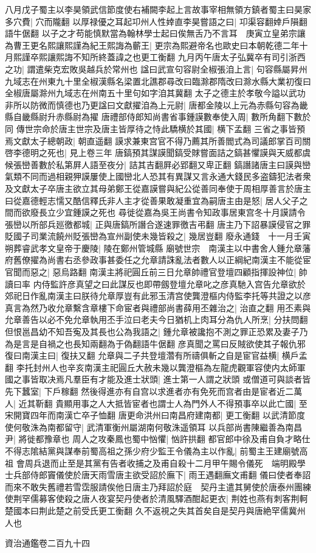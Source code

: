 八月戊子蜀主以李昊領武信節度使右補闕李起上言故事宰相無領方鎮者蜀主曰昊家多穴費|{
	穴而隴翻}
以厚禄優之耳起卭州人性婞直李昊嘗語之曰|{
	卭渠容翻婞戶隕翻語牛倨翻}
以子之才苟能慎默當為翰林學士起曰俟無舌乃不言耳　庚寅立皇弟宗讓為曹王更名熙讓熙謹為紀王熙誨為蘄王|{
	更宗為熙避帝名也歐史曰本朝乾德二年十月熙謹卒熙讓熙誨不知所終蓋諱之也更工衡翻}
九月丙午唐太子弘冀卒有司引浙西之功|{
	謂遣柴克宏敗吳越兵於常州也}
諡曰武宣句容尉全椒張洎上言|{
	句容縣屬昇州九域志在州東九十里全椒漢縣名梁置北譙郡尋改曰臨滁郡隋改曰滁水縣大業初復曰全椒唐屬滁州九域志在州南五十里句如字洎其冀翻}
太子之德主於孝敬今謚以武功非所以防微而慎德也乃更諡曰文獻擢洎為上元尉|{
	唐都金陵以上元為赤縣句容為畿縣自畿縣尉升赤縣尉為擢}
唐禮部侍郎知尚書省事鍾謨數奉使入周|{
	數所角翻下數於同}
傳世宗命於唐主世宗及唐主皆厚待之恃此驕横於其國|{
	横下孟翻}
三省之事皆預焉文獻太子總朝政|{
	朝直遥翻}
謨求兼東宫官不得乃薦其所善閻式為司議郎掌百司關啓李德明之死也|{
	見上卷三年}
唐鎬預其謀謨聞鎬受賕嘗面詰之鎬甚懼謨與天威都虞候張巒善數於私第屛人語至夜分|{
	詰其吉翻屛必郢翻又卑正翻}
鎬譖諸唐主曰謨與巒氣類不同而過相親狎謨屢使上國巒北人恐其有異謀又言永通大錢民多盗鑄犯法者衆及文獻太子卒唐主欲立其母弟鄭王從嘉謨嘗與紀公從善同奉使于周相厚善言於唐主曰從嘉德輕志懦又酷信釋氏非人主才從善果敢凝重宜為嗣唐主由是怒|{
	居人父子之間而欲廢長立少宜鍾謨之死也}
尋徙從嘉為吳王尚書令知政事居東宫冬十月謨請令張巒以所部兵廵徼都城|{
	正與唐鎬所譖合遂速罪徼吉弔翻}
唐主乃下詔暴謨侵官之罪貶國子司業流饒州貶張巒為宣州副使未幾皆殺之|{
	幾居豈翻}
廢永通錢　十一月壬寅朔葬睿武孝文皇帝于慶陵|{
	陵在鄭州管城縣}
廟號世宗　南漢主以中書舍人鍾允章藩府舊僚擢為尚書右丞參政事甚委任之允章請誅亂法者數人以正綱紀南漢主不能從宦官聞而惡之|{
	惡烏路翻}
南漢主將祀圓丘前三日允章帥禮官登壇四顧指揮設神位|{
	帥讀曰率}
内侍監許彦真望之曰此謀反也即帶劔登壇允章叱之彦真馳入宫告允章欲於郊祀日作亂南漢主曰朕待允章厚豈有此邪玉清宫使龔澄樞内侍監李托等共證之以彦真言為然乃收允章繫含章樓下命宦者與禮部尚書薛用丕雜治之|{
	治直之翻}
用丕素與允章善告以必不免允章執用丕手泣曰老夫今日猶机上肉耳分為仇人所烹|{
	分扶問翻}
但恨邕昌幼不知吾寃及其長也公為我語之|{
	鍾允章被讒抱不測之罪正恐累及妻子乃為是言是自禍之也長知兩翻為于偽翻語牛倨翻}
彦真聞之罵曰反賊欲使其子報仇邪復曰南漢主曰|{
	復扶又翻}
允章與二子共登壇濳有所禱俱斬之自是宦官益横|{
	横戶孟翻}
李托封州人也辛亥南漢主祀圓丘大赦未幾以龔澄樞為左龍虎觀軍容使内太師軍國之事皆取决焉凡羣臣有才能及進士狀頭|{
	進士第一人謂之狀頭}
或僧道可與談者皆先下蠶室|{
	下戶稼翻}
然後得進亦有自宫以求進者亦有免死而宫者由是宦者近二萬人|{
	近其靳翻}
貴顯用事之人大抵皆宦者也謂士人為門外人不得預事卒以此亡國|{
	至宋開寶四年而南漢亡卒子恤翻}
唐更命洪州曰南昌府建南都|{
	更工衡翻}
以武清節度使何敬洙為南都留守|{
	武清軍衡州屬湖南何敬洙遥領耳}
以兵部尚書陳繼善為南昌尹|{
	將徙都豫章也}
周人之攻秦鳳也蜀中忷懼|{
	忷許拱翻}
都官郎中徐及甫自負才略仕不得志隂結黨與謀奉前蜀高祖之孫少府少監王令儀為主以作亂|{
	前蜀主王建廟號高祖}
會周兵退而止至是其黨有告者收捕之及甫自殺十二月甲午賜令儀死　端明殿學士兵部侍郎竇儀使於唐天雨雪唐主欲受詔於廡下|{
	雨王遇翻廡文甫翻}
儀曰使者奉詔而來不敢失舊禮若雪霑服請俟他日唐主乃拜詔於庭　契丹主遣其舅使於唐泰州團練使荆罕儒募客使殺之唐人夜宴契丹使者於清風驛酒酣起更衣|{
	荆姓也燕有刺客荆軻楚國本曰荆此楚之前受氏更工衡翻}
久不返視之失其首矣自是契丹與唐絶罕儒冀州人也

資治通鑑卷二百九十四
